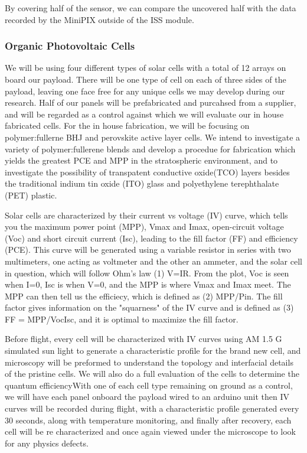 {By covering half of the sensor, we can compare the uncovered half with the data recorded by the MiniPIX outside of the ISS module.

\subsubsection{Organic Photovoltaic Cells}    
We will be using four different types of solar cells with a total of 12 arrays on board our payload. There will be one type of cell on each of three sides of the payload, leaving one face free for any unique cells we may develop during our research. Half of our panels will be prefabricated and purcahsed from a supplier, and will be regarded as a control against which we will evaluate our in house fabricated cells. For the in house fabrication, we will be focusing on polymer:fullerne BHJ and perovskite active layer cells. We intend to investigate a variety of polymer:fullerene blends and develop a procedue for fabrication which yields the greatest PCE and MPP in the stratospheric environment, and to investigate the possibility of transpatent conductive oxide(TCO) layers besides the traditional indium tin oxide (ITO) glass and polyethylene terephthalate (PET) plastic. 

Solar cells are characterized by their current vs voltage (IV) curve, which tells you the maximum power point (MPP), Vmax and Imax, open-circuit voltage (Voc) and short circuit current (Isc), leading to the fill factor (FF) and efficiency (PCE). This curve will be  generated using a variable resistor in series with two multimeters, one acting as voltmeter and the other an ammeter, and the solar cell in question, which will follow Ohm's law (1) V=IR. From the plot, Voc is seen when I=0, Isc is when V=0, and the MPP is where Vmax and Imax meet. The MPP can then tell us the efficiecy, which is defined as (2) MPP/Pin. The fill factor gives information on the "squarness" of the IV curve and is defined as (3) FF = MPP/VocIsc, and it is optimal to maximize the fill factor.

    Before flight, every cell will be characterized with IV curves using AM 1.5 G simulated sun light to generate a characteristic profile for the brand new cell, and microscopy will be preformed to understand the topology and interfacial details of the pristine cells. We will also do a full evaluation of the cells to determine the quantum efficiencyWith one of each cell type remaining on ground as a control, we will have each panel onboard the payload wired to an arduino unit then IV curves will be recorded during flight, with a characteristic profile generated every 30 seconds, along with temperature monitoring, and finally after recovery, each cell will be re characterized and once again viewed under the microscope to look for any physics defects. 
    
}
